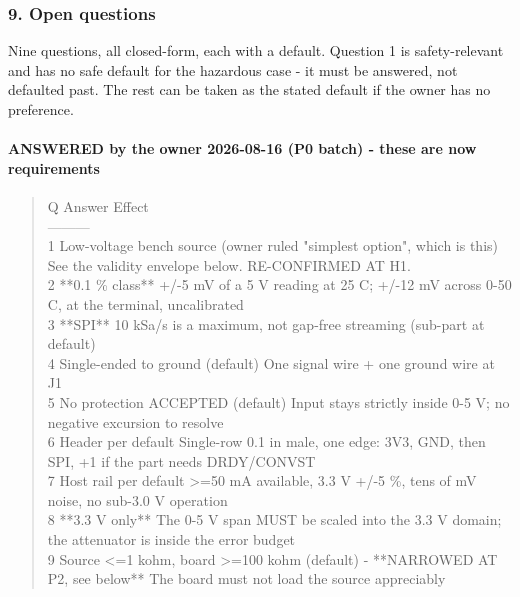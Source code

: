 \documentclass[11pt,a4paper]{article}
\begin{document}
\subsubsection*{9. Open questions}
Nine questions, all closed-form, each with a default. Question 1 is safety-relevant and has no safe default for the hazardous case - it must be answered, not defaulted past. The rest can be taken as the stated default if the owner has no preference.

\paragraph*{ANSWERED by the owner 2026-08-16 (P0 batch) - these are now requirements}
\begin{quote}\small\ttfamily\raggedright
\textbar{} Q \textbar{} Answer \textbar{} Effect \textbar{}\\
\textbar{}---\textbar{}---\textbar{}---\textbar{}\\
\textbar{} 1 \textbar{} Low-voltage bench source (owner ruled "simplest option", which is this) \textbar{} See the validity envelope below. RE-CONFIRMED AT H1. \textbar{}\\
\textbar{} 2 \textbar{} {*}{*}0.1 \% class{*}{*} \textbar{} +/-5 mV of a 5 V reading at 25 C; +/-12 mV across 0-50 C, at the terminal, uncalibrated \textbar{}\\
\textbar{} 3 \textbar{} {*}{*}SPI{*}{*} \textbar{} 10 kSa/s is a maximum, not gap-free streaming (sub-part at default) \textbar{}\\
\textbar{} 4 \textbar{} Single-ended to ground (default) \textbar{} One signal wire + one ground wire at J1 \textbar{}\\
\textbar{} 5 \textbar{} No protection ACCEPTED (default) \textbar{} Input stays strictly inside 0-5 V; no negative excursion to resolve \textbar{}\\
\textbar{} 6 \textbar{} Header per default \textbar{} Single-row 0.1 in male, one edge: 3V3, GND, then SPI, +1 if the part needs DRDY/CONVST \textbar{}\\
\textbar{} 7 \textbar{} Host rail per default \textbar{} \textgreater{}=50 mA available, 3.3 V +/-5 \%, tens of mV noise, no sub-3.0 V operation \textbar{}\\
\textbar{} 8 \textbar{} {*}{*}3.3 V only{*}{*} \textbar{} The 0-5 V span MUST be scaled into the 3.3 V domain; the attenuator is inside the error budget \textbar{}\\
\textbar{} 9 \textbar{} Source \textless{}=1 kohm, board \textgreater{}=100 kohm (default) - {*}{*}NARROWED AT P2, see below{*}{*} \textbar{} The board must not load the source appreciably \textbar{}
\end{quote}
\end{document}
